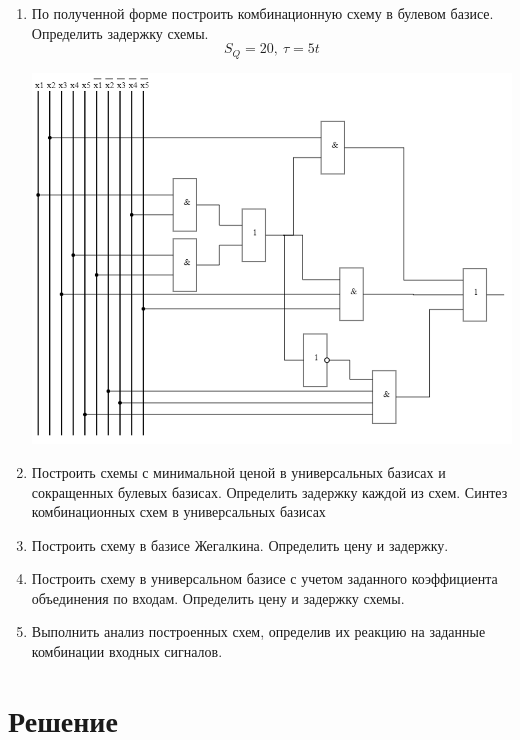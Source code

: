 \documentclass{article}
\begin{document}
\begin{enumerate}
       \item По полученной форме построить комбинационную схему в булевом базисе. Определить задержку схемы.
             $$ S_Q  = 20,\ τ=5t $$
             \begin{center}
                    \includegraphics[scale=0.4]{img2.png}
             \end{center}
       \item Построить схемы с минимальной ценой в универсальных базисах и сокращенных булевых базисах. Определить задержку каждой из схем.
             Синтез комбинационных схем в универсальных базисах
             
       \item Построить схему в базисе Жегалкина. Определить цену и задержку.
       \item Построить схему в универсальном базисе с учетом заданного коэффициента объединения по входам. Определить цену и задержку схемы.
       \item Выполнить анализ построенных схем, определив их реакцию на заданные комбинации входных сигналов.
\end{enumerate}
\section{Решение}
\end{document}
